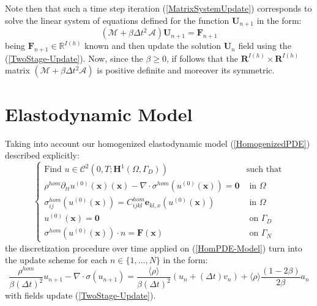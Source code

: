 Note then that such a time step iteration (\ref{MatrixSystemUpdate}) corresponds to solve the linear system of equations defined for the function $\mathbf{U}_{n+1}$ in the form:
\begin{equation*}
    (\mathcal{M}+ \beta \Delta t^2 \, \mathcal{A}) \mathbf{U}_{n+1} = \mathbf{F}_{n+1}
\end{equation*}
being $\mathbf{F}_{n+1} \in \mathbb{R}^{I(h)}$ known and then update the solution $\mathbf{U}_n$ field using the (\ref{TwoStage-Update}).
Now, since the $\beta \geq 0$, if follows that the $\mathbf{R}^{I(h)} \times \mathbf{R}^{I(h)}$ matrix $(\mathcal{M}+ \beta \Delta t^2 \mathcal{A})$ is positive definite and moreover its symmetric. 

\section{Elastodynamic Model}
Taking into account our homogenized elastodynamic model (\ref{HomogenizedPDE}) described explicitly:
\begin{equation}
    \label{HomPDE-Model}
    \left \{
    \begin{array}{cc}
        \text{Find $u \in \mathcal{C}^2(0,T;\mathbf{H}^1(\Omega, \Gamma_D))$} & \text{such that} \\
        \rho^{hom} \partial_{tt} u^{(0)}(\mathbf{x}) (\mathbf{x}) - \nabla \cdot \sigma^{hom} (u^{(0)}(\mathbf{x}) ) = \mathbf{0} & \text{ in } \Omega \\
        \sigma^{hom}_{ij}(u^{(0)}(\mathbf{x})) = C^{hom}_{ijkl}\mathbf{e}_{kl,x}(u^{(0)}(\mathbf{x})) & \text{ in } \Omega \\
        u^{(0)}(\mathbf{x}) = \mathbf{0} & \text{ on } \Gamma_D \\
        \sigma^{hom}(u^{(0)}(\mathbf{x})) \cdot n = \mathbf{F}(\mathbf{x}) & \text{ on } \Gamma_N
    \end{array}
    \right .
\end{equation}
the discretization procedure over time applied on (\ref{HomPDE-Model}) turn into the update scheme for each $n \in \{1,\dots, N\}$ in the form:
\begin{equation*}
    \label{HomPDE-TimeUpdate}
    \frac{\rho^{hom}}{\beta (\Delta t)^2} u_{n+1} - \nabla \cdot \sigma(u_{n+1}) = \frac{\langle\rho\rangle}{\beta (\Delta t)^2} ( u_{n} + (\Delta t) v_n ) + \langle\rho\rangle\frac{(1-2\beta)}{2\beta} a_n
\end{equation*}
with fields update (\ref{TwoStage-Update}).

